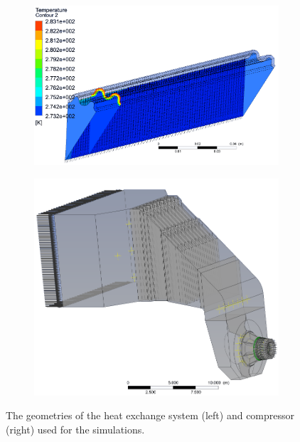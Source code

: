 \documentclass[3p,times]{elsarticle}
\begin{document}
\begin{figure}
\centering
\begin{subfigure}{.4\textwidth}
	\centering
	\includegraphics[width=\linewidth]{pipe_nobg}	
	\label{fig:pipe}
\end{subfigure}
\begin{subfigure}{.5\textwidth}
	\centering
	\includegraphics[width=.7\linewidth]{compressor_nobg}
	\label{fig:compressor}
\end{subfigure}

\caption{The geometries of the heat exchange system (left) and compressor (right) used for the simulations. }
\label{fig:cfx}
\end{figure}
\end{document}
